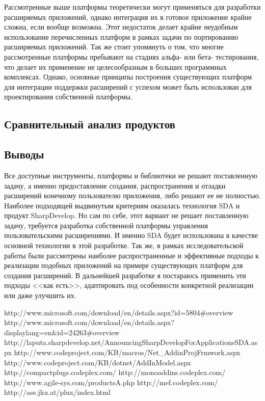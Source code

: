 Рассмотренные выше платформы теоретически могут применяться для разработки расширяемых приложений, однако интеграция их в готовое приложение крайне сложна, если вообще возможна. Этот недостаток делает крайне неудобным использование перечисленных платформ в рамках задачи по портированию расширяемых приложений. Так же стоит упомянуть о том, что многие рассмотренные платформы пребывают на стадиях альфа- или бета- тестирования, что делает их применение не целесообразным в больших программных комплексах. Однако, основные принципы построения существующих платформ для интеграции поддержки расширений с успехом может быть использован для проектирования собственной платформы.

\subsection{Сравнительный анализ продуктов}




\subsection{Выводы}

Все доступные инструменты, платформы и библиотеки не решают поставленную задачу, а именно предоставление создания, распространения и отладки расширений конечному пользователю приложения, либо решают ее не полностью. Наиболее подходящей выдвинутым критериям оказалась технология SDA и продукт SharpDevelop.  Но сам по себе, этот вариант не решает поставленную задачу, требуется разработка собственной платформы управления пользовательскими расширениями. И именно SDA будет использована в качестве основной технологии в этой разработке. Так же, в рамках исследовательской работы были рассмотрены наиболее распространенные и эффективные подходы к реализации подобных приложений на примере существующих платформ для создания расширений. В дальнейшей разработке я постараюсь применить эти подходы <<как есть>>, адаптировать под особенности конкретной реализации или даже улучшить их.

http://www.microsoft.com/download/en/details.aspx?id=5804\#overview
http://www.microsoft.com/download/en/details.aspx?displaylang=en\&id=24263\#overview
http://laputa.sharpdevelop.net/AnnouncingSharpDevelopForApplicationsSDA.aspx
http://www.codeproject.com/KB/macros/Net\_AddinProjFrmwork.aspx
http://www.codeproject.com/KB/dotnet/AddInModel.aspx
http://compactplugs.codeplex.com/
http://monoaddins.codeplex.com/
http://www.agile-sys.com/productsA.php
http://mef.codeplex.com/
http://ase.jku.at/plux/index.html

\pagebreak

